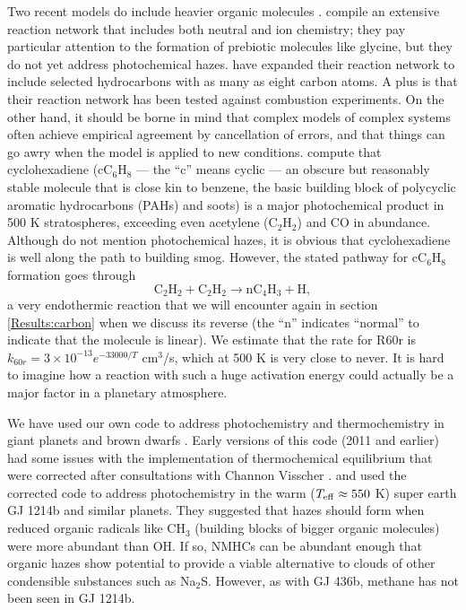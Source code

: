 \documentclass[preprint]{aastex6}
\newcounter{reaction}
\begin{document}
Two recent models do include heavier organic molecules \citep{Rimmer2016, Venot2015}.
\citet{Rimmer2016} compile an extensive reaction network that includes both neutral and ion chemistry;
 they pay particular attention to the formation of prebiotic molecules like glycine, but they do not yet address photochemical hazes.
\citet{Venot2015} have expanded their reaction network to include selected hydrocarbons with as many as eight carbon atoms.
A plus is that their reaction network has been tested against combustion experiments.
On the other hand, it should be borne in mind that complex models of complex systems often achieve empirical agreement by cancellation of errors,
and that things can go awry when the model is applied to new conditions.
 \citet{Venot2015} compute that cyclohexadiene (cC$_6$H$_8$ --- the ``c'' means cyclic --- an obscure but reasonably stable
 molecule {\color{red} that is close kin to benzene, the basic building block of {\color{red} polycyclic aromatic hydrocarbons (PAHs)} and soots})
 is a major photochemical product in 500 K stratospheres, exceeding even acetylene (C$_2$H$_2$) and CO in abundance.  
 Although \citet{Venot2015} do not mention photochemical hazes, it is obvious that cyclohexadiene
 is well along the path to building smog.  
 However, the stated pathway for cC$_6$H$_8$ formation goes through  
 \begin{equation}\tag{R60r}
 \mathrm{C}_2\mathrm{H}_2 + \mathrm{C}_2\mathrm{H}_2  \rightarrow \mathrm{nC}_4\mathrm{H}_3 + \mathrm{H},
 \end{equation}
 a very endothermic reaction that we will encounter again in section \ref{Results:carbon} when we discuss its 
 reverse {\color{red} (the ``n'' indicates ``normal'' to indicate that the molecule is linear)}.
 We estimate that the rate for R60r is $k_{60r}= 3\times 10^{-13} e^{-33000/T}$ cm$^{3}$/s, which at 500 K is very close to never.
 It is hard to imagine how a reaction with such a huge activation energy could actually be a major factor in a planetary atmosphere.
 
We have used our own code to address photochemistry and thermochemistry in giant planets and brown dwarfs
\citet{Zahnle1995, Zahnle2009,Zahnle2014}.
Early versions of this code (2011 and earlier) had some issues with the implementation of thermochemical
equilibrium that were corrected after consultations with Channon Visscher \citep[see][]{Visscher2011}. 
\citet{Miller-Ricci2012} and \citet{Morley2013} used the corrected code 
 to address photochemistry in the warm ($T_{\rm eff}\approx 550$ K) super earth GJ 1214b and similar planets.
They suggested that hazes should form when reduced organic radicals like CH$_3$ (building blocks of
bigger organic molecules) were more abundant than OH.
If so, NMHCs can be abundant enough that organic hazes show potential to provide
a viable alternative to clouds of other condensible substances such as Na$_2$S.     
 However, as with GJ 436b, methane has not been seen in GJ 1214b.
\end{document}

